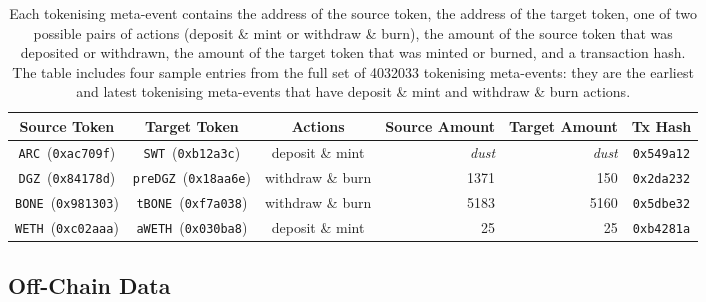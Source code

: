 \begin{table*}
  \centering
  \caption{Each tokenising meta-event contains the address of the
    source token, the address of the target token, one of two possible
    pairs of actions (deposit \& mint or withdraw \& burn), the amount
    of the source token that was deposited or withdrawn, the amount of
    the target token that was minted or burned, and a transaction
    hash.  The table includes four sample entries from the full set of
    \num{4032033} tokenising meta-events: they are the earliest and
    latest tokenising meta-events that have deposit \& mint and
    withdraw \& burn actions.}\label{tab:meta-events}
  \begin{tabular}{|c|c|c|r|r|c|}
    \hline
    Source Token &
    Target Token &
    Actions &
    Source Amount &
    Target Amount &
    Tx Hash\\
    \hline

    \texttt{ARC}~(\texttt{0xac709f}) &
    \texttt{SWT}~(\texttt{0xb12a3c}) & deposit \& mint & \textit{dust}
    & \textit{dust} & \texttt{0x549a12}\\

    \texttt{DGZ}~(\texttt{0x84178d}) &
    \texttt{preDGZ}~(\texttt{0x18aa6e}) & withdraw \& burn &
    \num{1371} & \num{150} & \texttt{0x2da232}\\

    \texttt{BONE}~(\texttt{0x981303}) &
    \texttt{tBONE}~(\texttt{0xf7a038}) & withdraw \& burn & \num{5183}
    & \num{5160} & \texttt{0x5dbe32}\\

    \texttt{WETH}~(\texttt{0xc02aaa}) &
    \texttt{aWETH}~(\texttt{0x030ba8}) & deposit \& mint & \num{25} &
    \num{25} & \texttt{0xb4281a}\\

    \hline
  \end{tabular}
\end{table*}

\subsection{Off-Chain Data}\label{sec:data-off-chain}

